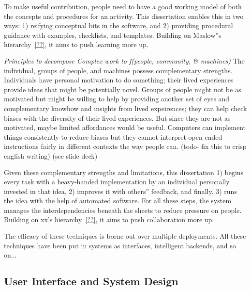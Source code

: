 To make useful contribution, people need to have a good working model of both the concepts and procedures for an activity. This dissertation enables this in two ways: 1) reifying conceptual bits in the software, and 2) providing procedural guidance with examples, checklists, and templates. Building on Maslow''s hierarchy~\ref{??}, it aims to push learning more up.

\textit{Principles to decompose Complex work to f(people, community, \& machines)}
The individual, groups of people, and machines possess complementary strengths. Individuals have personal motivation to do something; their lived experiences provide ideas that might be potentially novel. Groups of people might not be as motivated but might be willing to help by providing another set of eyes and complementary knowhow and insights from lived expeirences; they can help check biases with the diversity of their lived experiences. But since they are not as motivated, maybe limited affordances would be useful. Computers can implement things consistently to reduce biases but they cannot interpret open-ended instructions fairly in different contexts the way people can.  (todo- fix this to crisp english writing) (see slide deck)

Given these complementary strengths and limitations, this dissertation 1) begins every task with a heavy-handed implementation by an individual personally invested in that idea, 2) improves it with others'' feedback, and finally, 3) runs the idea with the help of automated software. For all these steps, the system manages the interdependencies beneath the sheets to reduce pressure on people. Building on xx's hierarchy~\ref{??}, it aims to push collaboration more up.

The efficacy of these techniques is borne out over multiple deployments. All these techniques have been put in systems as interfaces, intelligent backends, and so on... \\


\subsection{User Interface and System Design}


